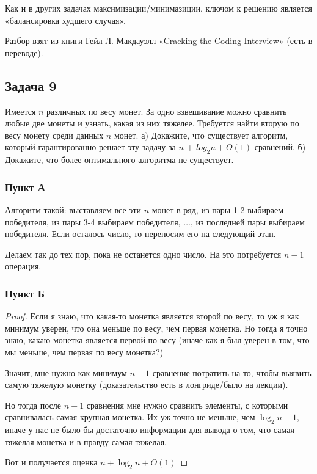 Как и в других задачах максимизации/минимазиции, ключом к решению является «балансировка худшего случая».

Разбор взят из книги Гейл Л. Макдауэлл «Cracking the Coding Interview» (есть в переводе).

\subsection{Задача 9}

Имеется $n$ различных по весу монет. За одно взвешивание можно сравнить любые
две монеты и узнать, какая из них тяжелее. Требуется найти вторую по весу монету
среди данных $n$ монет.
а) Докажите, что существует алгоритм, который гарантированно решает эту задачу
за $n$ + $log_2{n} + O(1)$ сравнений.
б) Докажите, что более оптимального алгоритма не существует.

\subsubsection{Пункт А}

Алгоритм такой: выставляем все эти $n$ монет в ряд, из пары 1-2 выбираем победителя, из пары 3-4 выбираем победителя, $\ldots$, из последней пары выбираем победителя. Если осталось число, то переносим его на следующий этап.

Делаем так до тех пор, пока не останется одно число. На это потребуется $n - 1$ операция.

\subsubsection{Пункт Б}
\begin{proof}
Если я знаю, что какая-то монетка является второй по весу, то уж я как минимум уверен, что она меньше по весу, чем первая монетка. Но тогда я точно знаю, какаю монетка является первой по весу (иначе как я был уверен в том, что мы меньше, чем первая по весу монетка?)

Значит, мне нужно как минимум $n - 1$ сравнение потратить на то, чтобы выявить самую тяжелую монетку (доказательство есть в лонгриде/было на лекции).

Но тогда после $n - 1$ сравнения мне нужно сравнить элементы, с которыми сравнивалась самая крупная монетка. Их уж точно не меньше, чем $\log_2n - 1$, иначе у нас не было бы достаточно информации для вывода о том, что самая тяжелая монетка и в правду самая тяжелая.

Вот и получается оценка $n + \log_2n + O(1)$
\end{proof}